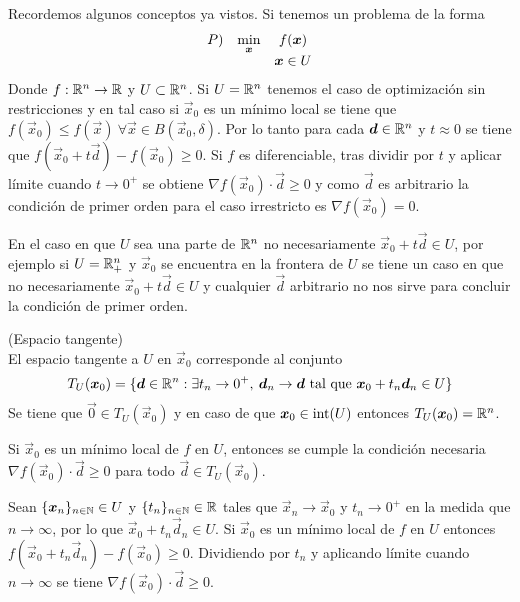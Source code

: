 Recordemos algunos conceptos ya vistos. Si tenemos un problema de la forma
\begin{equation}\label{problema-kkt1}
\begin{array}{lcc}
P)  & \displaystyle \min_{\vec{x}} 	& f(\vec{x})    \cr
	&							& \vec{x}\in U  	
\end{array}
\end{equation}
Donde $f:\R^n \to \R$ y $U\subset \R^n$. Si $U=\R^n$ tenemos el caso de optimizaci\'on sin restricciones y en tal caso si $\vec{x}_0$ es un m\'inimo local se tiene que $f(\vec{x}_0)\leq f(\vec{x}) \:\forall \vec{x}\in B(\vec{x}_0,\delta)$. Por lo tanto para cada $\vec{d}\in \R^n$ y $t\approx 0$ se tiene que $f(\vec{x}_0+t\vec{d})-f(\vec{x}_0)\geq 0$. Si $f$ es diferenciable, tras dividir por $t$ y aplicar l\'imite cuando $t\to 0^+$ se obtiene $\nabla f(\vec{x}_0) \cdot \vec{d} \geq 0$ y como $\vec{d}$ es arbitrario la condici\'on de primer orden para el caso irrestricto es $\nabla f(\vec{x}_0) = 0$.

En el caso en que $U$ sea una parte de $\R^n$ no necesariamente $\vec{x}_0 + t\vec{d} \in U$, por ejemplo si $U=\R^n_+$ y $\vec{x}_0$ se encuentra en la frontera de $U$ se tiene un caso en que no necesariamente $\vec{x}_0 + t\vec{d} \in U$ y cualquier $\vec{d}$ arbitrario no nos sirve para concluir la condici\'on de primer orden.

\begin{definicion}{\rm (Espacio tangente)}
\\El espacio tangente a $U$ en $\vec{x}_0$ corresponde al conjunto
$$T_U(\vec{x}_0) = \{\vec{d}\in \R^n : \exists t_n \to 0^+,\: \vec{d}_n \to \vec{d} \text{ tal que } \vec{x}_0 + t_n \vec{d}_n \in U\}$$
Se tiene que $\vec{0}\in T_U (\vec{x}_0)$ y en caso de que $\vec{x}_0 \in \inte{U}$ entonces $T_U (\vec{x}_0) = \R^n$.
\end{definicion}

\begin{teorema}
Si $\vec{x}_0$ es un m\'inimo local de $f$ en $U$, entonces se cumple la condici\'on necesaria $\nabla f(\vec{x}_0)\cdot \vec{d} \geq 0$ para todo $\vec{d}\in T_U(\vec{x}_0)$.
\end{teorema}

\begin{demostracion}
Sean $\{\vec{x}_n\}_{n\in \N} \in U$  y $\{t_n\}_{n\in \N} \in \R$ tales que $\vec{x}_n \to \vec{x}_0$ y $t_n \to 0^+$ en la medida que $n\to \infty$, por lo que $\vec{x}_0 + t_n \vec{d}_n \in U$. Si $\vec{x}_0$ es un m\'inimo local de $f$ en $U$ entonces
$f(\vec{x}_0 + t_n \vec{d}_n) - f(\vec{x}_0) \geq 0$. Dividiendo por $t_n$ y aplicando l\'imite cuando $n\to \infty$ se tiene
$\nabla f(\vec{x}_0)\cdot \vec{d} \geq 0$.
\end{demostracion}

